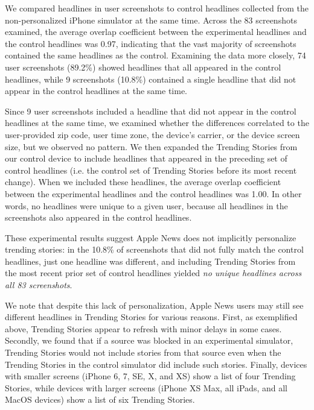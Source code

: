 We compared headlines in user screenshots to control headlines collected from the non-personalized iPhone simulator at the same time. Across the 83 screenshots examined, the average overlap coefficient between the experimental headlines and the control headlines was 0.97, indicating that the vast majority of screenshots contained the same headlines as the control. Examining the data more closely, 74 user screenshots (89.2\%) showed headlines that all appeared in the control headlines, while 9 screenshots (10.8\%) contained a single headline that did not appear in the control headlines at the same time.

Since 9 user screenshots included a headline that did not appear in the control headlines at the same time, we examined whether the differences correlated to the user-provided zip code, user time zone, the device's carrier, or the device screen size, but we observed no pattern. We then expanded the Trending Stories from our control device to include headlines that appeared in the preceding set of control headlines (i.e. the control set of Trending Stories before its most recent change). When we included these headlines, the average overlap coefficient between the experimental headlines and the control headlines was 1.00. In other words, no headlines were unique to a given user, because all headlines in the screenshots also appeared in the control headlines.

These experimental results suggest Apple News does not implicitly personalize trending stories: in the 10.8\% of screenshots that did not fully match the control headlines, just one headline was different, and including Trending Stories from the most recent prior set of control headlines yielded \textit{no unique headlines across all 83 screenshots}.

We note that despite this lack of personalization, Apple News users may still see different headlines in Trending Stories for various reasons. First, as exemplified above, Trending Stories appear to refresh with minor delays in some cases. Secondly, we found that if a source was blocked in an experimental simulator, Trending Stories would not include stories from that source even when the Trending Stories in the control simulator did include such stories. Finally, devices with smaller screens (iPhone 6, 7, SE, X, and XS) show a list of four Trending Stories, while devices with larger screens (iPhone XS Max, all iPads, and all MacOS devices) show a list of six Trending Stories.



